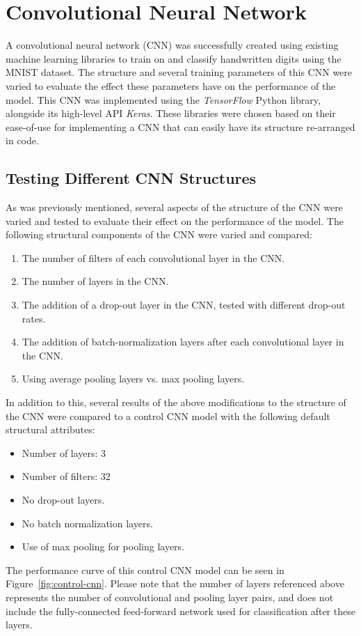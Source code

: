 \documentclass[a4paper]{article}
\begin{document}
\section{Convolutional Neural Network}
A convolutional neural network (CNN) was successfully created using existing machine learning libraries to train on and classify handwritten digits using the MNIST dataset. The structure and several training parameters of this CNN were varied to evaluate the effect these parameters have on the performance of the model. This CNN was implemented using the \textit{TensorFlow} Python library, alongside its high-level API \textit{Keras}. These libraries were chosen based on their ease-of-use for implementing a CNN that can easily have its structure re-arranged in code. 

\subsection{Testing Different CNN Structures}

As was previously mentioned, several aspects of the structure of the CNN were varied and tested to evaluate their effect on the performance of the model. The following structural components of the CNN were varied and compared:
\begin{enumerate}
    \item The number of filters of each convolutional layer in the CNN.
    \item The number of layers in the CNN.
    \item The addition of a drop-out layer in the CNN, tested with different drop-out rates.
    \item The addition of batch-normalization layers after each convolutional layer in the CNN.
    \item Using average pooling layers vs. max pooling layers. 
\end{enumerate}
In addition to this, several results of the above modifications to the structure of the CNN were compared to a control CNN model with the following default structural attributes:
\begin{itemize}
    \item Number of layers: 3
    \item Number of filters: 32
    \item No drop-out layers.
    \item No batch normalization layers.
    \item Use of max pooling for pooling layers.
\end{itemize}
The performance curve of this control CNN model can be seen in Figure~\ref{fig:control-cnn}. Please note that the number of layers referenced above represents the number of convolutional and pooling layer pairs, and does not include the fully-connected feed-forward network used for classification after these layers.
\end{document}
